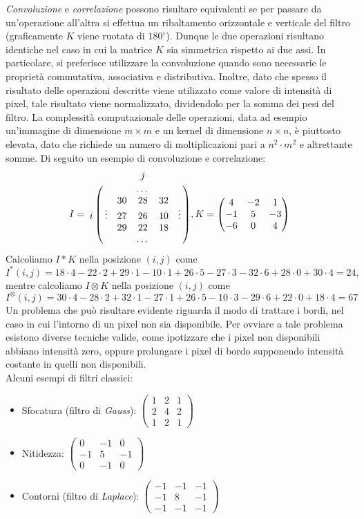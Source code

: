 \textit{Convoluzione} e \textit{correlazione} possono risultare equivalenti se per passare da un'operazione all'altra si effettua un ribaltamento orizzontale e verticale del filtro (graficamente $K$ viene ruotata di $180^{\circ}$). Dunque le due operazioni risultano identiche nel caso in cui la matrice $K$ sia simmetrica rispetto ai due assi. In particolare, si preferisce utilizzare la convoluzione quando sono necessarie le propriet\`a commutativa, associativa e distributiva. Inoltre, dato che spesso il risultato delle operazioni descritte viene utilizzato come valore di intensit\`a di pixel, tale risultato viene normalizzato, dividendolo per la somma dei pesi del filtro. La complessit\`a computazionale delle operazioni, data ad esempio un'immagine di dimensione $m\times m$ e un kernel di dimensione $n\times n$, \`e piuttosto elevata, dato che richiede un numero di moltiplicazioni pari a $n^{2}\cdot m^{2}$ e altrettante somme. Di seguito un esempio di convoluzione e correlazione:
$$
I=\bordermatrix{
		& & & j & & \cr
        & & & \dots & & \cr
		& & 30 & 28 & 32 & \cr
		i & \vdots & 27 & 26 & 10 & \vdots \cr
		& & 29 & 22 & 18 & \cr
		& & & \dots & & \cr
	},
K=\begin{pmatrix} 
	4 & -2 & 1 \\
	-1 & 5 & -3\\
	-6 & 0 & 4
\end{pmatrix}
$$
Calcoliamo $I * K$ nella posizione $(i, j)$ come $$I^{*}(i, j) = 18\cdot 4 - 22\cdot 2 + 29\cdot 1 - 10\cdot 1+ 26\cdot 5 -27\cdot 3 - 32\cdot 6 + 28\cdot 0 + 30\cdot 4 = 24,$$
mentre calcoliamo $I \otimes K$ nella posizione $(i, j)$ come $$I^{\otimes}(i, j) = 30\cdot 4 - 28\cdot 2 + 32\cdot 1 - 27\cdot 1+ 26\cdot 5 -10\cdot 3 - 29\cdot 6 + 22\cdot 0 + 18\cdot 4 = 67$$
Un problema che pu\`o risultare evidente riguarda il modo di trattare i bordi, nel caso in cui l'intorno di un pixel non sia disponibile. Per ovviare a tale problema esistono diverse tecniche valide, come ipotizzare che i pixel non disponibili abbiano intensit\`a zero, oppure prolungare i pixel di bordo supponendo intensit\`a costante in quelli non disponibili.\\
Alcuni esempi di filtri classici:
\begin{itemize}
	\item Sfocatura (filtro di \textit{Gauss}): $\begin{pmatrix} 
		1 & 2 & 1 \\
		2 & 4 & 2\\
		1 & 2 & 1
	\end{pmatrix}$
	\item Nitidezza: $\begin{pmatrix} 
		0 & -1 & 0 \\
		-1 & 5 & -1\\
		0 & -1 & 0
	\end{pmatrix}$
	\item Contorni (filtro di \textit{Laplace}): $\begin{pmatrix} 
		-1 & -1 & -1 \\
		-1 & 8 & -1\\
		-1 & -1 & -1
	\end{pmatrix}$
\end{itemize}


